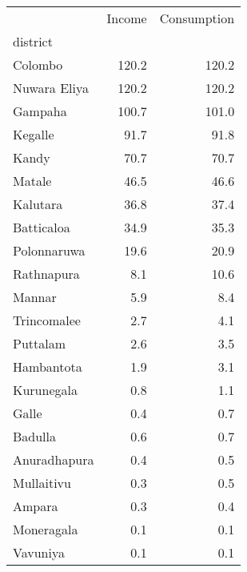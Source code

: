 \begin{tabular}{lrr}
\toprule
{} &  Income &  Consumption \\
district     &         &              \\
\midrule
Colombo      &   120.2 &        120.2 \\
Nuwara Eliya &   120.2 &        120.2 \\
Gampaha      &   100.7 &        101.0 \\
Kegalle      &    91.7 &         91.8 \\
Kandy        &    70.7 &         70.7 \\
Matale       &    46.5 &         46.6 \\
Kalutara     &    36.8 &         37.4 \\
Batticaloa   &    34.9 &         35.3 \\
Polonnaruwa  &    19.6 &         20.9 \\
Rathnapura   &     8.1 &         10.6 \\
Mannar       &     5.9 &          8.4 \\
Trincomalee  &     2.7 &          4.1 \\
Puttalam     &     2.6 &          3.5 \\
Hambantota   &     1.9 &          3.1 \\
Kurunegala   &     0.8 &          1.1 \\
Galle        &     0.4 &          0.7 \\
Badulla      &     0.6 &          0.7 \\
Anuradhapura &     0.4 &          0.5 \\
Mullaitivu   &     0.3 &          0.5 \\
Ampara       &     0.3 &          0.4 \\
Moneragala   &     0.1 &          0.1 \\
Vavuniya     &     0.1 &          0.1 \\
\bottomrule
\end{tabular}

